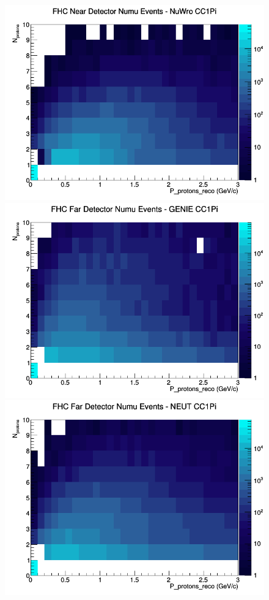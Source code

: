 \documentclass[12pt]{article}
\begin{document}
\begin{figure}[h]
\includegraphics[width=\linewidth]{eff_N_P/FGT/protons/CC1Pi_FHC_ND_numu_N_P_NuWro.png}
\endminipage
\newline
{}
\includegraphics[width=\linewidth]{eff_N_P/FGT/protons/CC1Pi_FHC_FD_numu_N_P_GENIE.png}
\endminipage
{}
\includegraphics[width=\linewidth]{eff_N_P/FGT/protons/CC1Pi_FHC_FD_numu_N_P_NEUT.png}

\end{figure}
\end{document}
